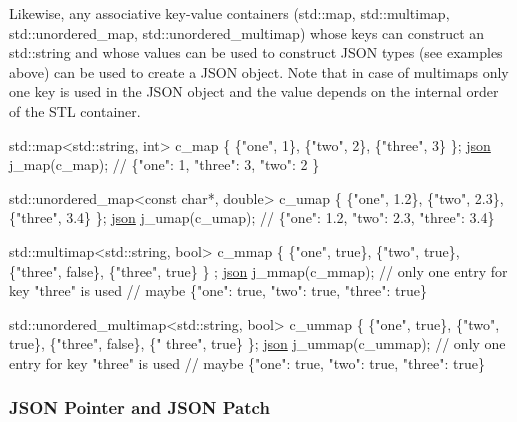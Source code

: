 Likewise, any associative key-\/value containers ({\ttfamily std\+::map}, {\ttfamily std\+::multimap}, {\ttfamily std\+::unordered\+\_\+map}, {\ttfamily std\+::unordered\+\_\+multimap}) whose keys can construct an {\ttfamily std\+::string} and whose values can be used to construct J\+S\+ON types (see examples above) can be used to create a J\+S\+ON object. Note that in case of multimaps only one key is used in the J\+S\+ON object and the value depends on the internal order of the S\+TL container.


\begin{DoxyCode}
std::map<std::string, int> c\_map \{ \{\textcolor{stringliteral}{"one"}, 1\}, \{\textcolor{stringliteral}{"two"}, 2\}, \{\textcolor{stringliteral}{"three"}, 3\} \};
\hyperlink{classnlohmann_1_1basic__json}{json} j\_map(c\_map);
\textcolor{comment}{// \{"one": 1, "three": 3, "two": 2 \}}

std::unordered\_map<const char*, double> c\_umap \{ \{\textcolor{stringliteral}{"one"}, 1.2\}, \{\textcolor{stringliteral}{"two"}, 2.3\}, \{\textcolor{stringliteral}{"three"}, 3.4\} \};
\hyperlink{classnlohmann_1_1basic__json}{json} j\_umap(c\_umap);
\textcolor{comment}{// \{"one": 1.2, "two": 2.3, "three": 3.4\}}

std::multimap<std::string, bool> c\_mmap \{ \{\textcolor{stringliteral}{"one"}, \textcolor{keyword}{true}\}, \{\textcolor{stringliteral}{"two"}, \textcolor{keyword}{true}\}, \{\textcolor{stringliteral}{"three"}, \textcolor{keyword}{false}\}, \{\textcolor{stringliteral}{"three"}, \textcolor{keyword}{true}\} \}
      ;
\hyperlink{classnlohmann_1_1basic__json}{json} j\_mmap(c\_mmap); \textcolor{comment}{// only one entry for key "three" is used}
\textcolor{comment}{// maybe \{"one": true, "two": true, "three": true\}}

std::unordered\_multimap<std::string, bool> c\_ummap \{ \{\textcolor{stringliteral}{"one"}, \textcolor{keyword}{true}\}, \{\textcolor{stringliteral}{"two"}, \textcolor{keyword}{true}\}, \{\textcolor{stringliteral}{"three"}, \textcolor{keyword}{false}\}, \{\textcolor{stringliteral}{"
      three"}, \textcolor{keyword}{true}\} \};
\hyperlink{classnlohmann_1_1basic__json}{json} j\_ummap(c\_ummap); \textcolor{comment}{// only one entry for key "three" is used}
\textcolor{comment}{// maybe \{"one": true, "two": true, "three": true\}}
\end{DoxyCode}


\subsubsection*{J\+S\+ON Pointer and J\+S\+ON Patch}

